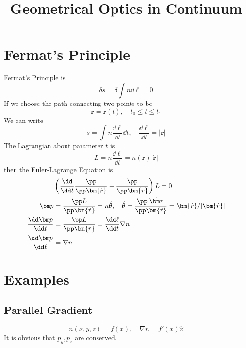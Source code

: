 \documentclass[12pt]{article}
\title{Geometrical Optics in Continuum}
\author{\zpj}
\begin{document}
\maketitle
\section{Fermat's Principle}
Fermat's Principle is
\begin{equation}
\delta s=\delta\int n\dd \ell=0
\end{equation}
If we choose the path connecting two points to be
\begin{equation}\bm r=\bm r(t),\quad t_0\leq t\leq t_1\end{equation}
We can write
\begin{equation}
s=\int n\frac{\dd \ell}{\dd t}\dd t, \quad \frac{\dd \ell}{\dd t}=|\dot{\bm r}|
\end{equation}
The Lagrangian about parameter $t$ is
\begin{equation}
L=n\frac{\dd \ell}{\dd t}=n(\bm r)|\bm{\dot r}|
\end{equation}
then the Euler-Lagrange Equation is
\begin{align}
&\left(\frac{\dd}{\dd t}\frac{\pp}{\pp\bm{\dot r}}-\frac{\pp}{\pp\bm{r}}\right)L=0\\
\bm p&=\frac{\pp L}{\pp \bm{\dot r}}=n \hat\theta,\quad\hat{\theta}=\frac{\pp |\dot{\bm r}|}{\pp \bm{\dot r}}=\bm{\dot r}/|\bm{\dot r}|\\
\frac{\dd \bm p}{\dd t}&=\frac{\pp L}{\pp \bm{r}}=\frac{\dd\ell}{\dd t}\nabla n\\
\frac{\dd \bm p}{\dd \ell}&=\nabla n
\end{align}
\section{Examples}
\subsection{Parallel Gradient}
\begin{equation}
	n(x,y,z)=f(x),\quad\nabla n=f'(x)\hat x
\end{equation}
It is obvious that $p_y,p_z$ are conserved.
\end{document}
